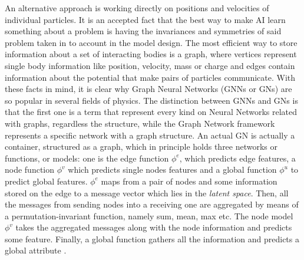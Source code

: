 \documentclass[../../master_thesis_np.tex]{subfiles}
\begin{document}
	An alternative approach is working directly on positions and velocities of individual particles. 
	It is an accepted fact that the best way to make AI learn something about a problem is having the invariances and symmetries of said problem taken in to account in the model design. 
	The most efficient way to store information about a set of interacting bodies is a graph, where vertices represent single body information like position, velocity, mass or charge and edges contain information about the potential that make pairs of particles communicate. 
	With these facts in mind, it is clear why Graph Neural Networks (GNNs or GNs) are so popular in several fields of physics. 
	The distinction between GNNs and GNs is that the first one is a term that represent every kind on Neural Networks related with graphs, regardless the structure, while the Graph Network framework represents a specific network with a graph structure. 
	An actual GN is actually a container, structured as a graph, which in principle holds three networks or functions, or models: one is the edge function $\phi^e$, which predicts edge features, a node function $\phi^v$ which predicts single nodes features and a global function $\phi^u$ to predict global features. 
	$\phi^e$ maps from a pair of nodes and some information stored on the edge to a message vector which lies in the \emph{latent space}. 
	Then, all the messages from sending nodes into a receiving one are aggregated by means of a permutation-invariant function, namely sum, mean, max etc. 
	The node model $\phi^v$ takes the aggregated messages along with the node information and predicts some feature. 
	Finally, a global function gathers all the information and predicts a global attribute \cite{battaglia_relational_2018}.
	
\end{document}
